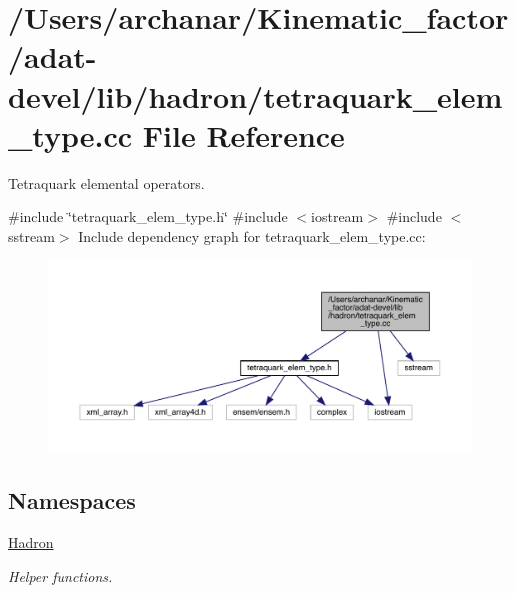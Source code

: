 \hypertarget{adat-devel_2lib_2hadron_2tetraquark__elem__type_8cc}{}\section{/\+Users/archanar/\+Kinematic\+\_\+factor/adat-\/devel/lib/hadron/tetraquark\+\_\+elem\+\_\+type.cc File Reference}
\label{adat-devel_2lib_2hadron_2tetraquark__elem__type_8cc}


Tetraquark elemental operators.  


{\ttfamily \#include \char`\"{}tetraquark\+\_\+elem\+\_\+type.\+h\char`\"{}}\newline
{\ttfamily \#include $<$iostream$>$}\newline
{\ttfamily \#include $<$sstream$>$}\newline
Include dependency graph for tetraquark\+\_\+elem\+\_\+type.\+cc\+:
\nopagebreak
\begin{figure}[H]
\begin{center}
\leavevmode
\includegraphics[width=350pt]{dd/d52/adat-devel_2lib_2hadron_2tetraquark__elem__type_8cc__incl}
\end{center}
\end{figure}
\subsection*{Namespaces}
\begin{DoxyCompactItemize}
\item 
 \mbox{\hyperlink{namespaceHadron}{Hadron}}
\begin{DoxyCompactList}\small\item\em Helper functions. \end{DoxyCompactList}\end{DoxyCompactItemize}
